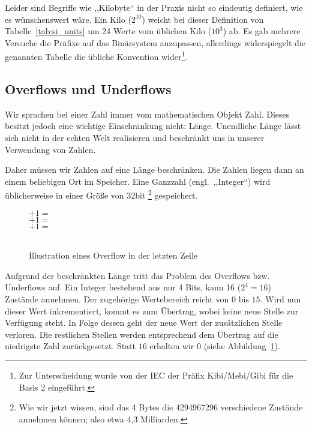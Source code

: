 Leider sind Begriffe wie ,,Kilobyte`` in der Praxis nicht so eindeutig definiert, wie es wünschenswert wäre. Ein Kilo ($2^{10}$) weicht bei dieser Definition von Tabelle~\ref{tab:si_units} um 24 Werte vom üblichen Kilo ($10^3$) ab. Es gab mehrere Versuche die Präfixe auf das Binärsystem anzupassen, allerdings widerspiegelt die genannten Tabelle die übliche Konvention wider\footnote{Zur Unterscheidung wurde von der IEC der Präfix Kibi/Mebi/Gibi für die Basis 2 eingeführt.}.

\subsection{Overflows und Underflows}
%
Wir sprachen bei einer Zahl immer vom mathematischen Objekt Zahl. Dieses
besitzt jedoch eine wichtige Einschränkung nicht: Länge. Unendliche Länge
lässt sich nicht in der echten Welt realisieren und beschränkt uns in
unserer Verwendung von Zahlen.

Daher müssen wir Zahlen auf eine Länge beschränken. Die Zahlen liegen
dann an einem beliebigen Ort im Speicher. Eine Ganzzahl (engl.~,,Integer``)
wird üblicherweise in einer Größe von 32bit%
\footnote{Wie wir jetzt wissen, sind das 4 Bytes die 4294967296
verschiedene Zustände annehmen können; also etwa 4,3 Milliarden.}
gespeichert.

\begin{figure}[ht]
  \begin{center}
        $+ 1 =$ \\
        $+ 1 =$ \\
        $+ 1 =$ \\
        \hspace{27.5pt}~
  \end{center}
  \caption{Illustration eines Overflow in der letzten Zeile}
  \label{fig:overflow}
\end{figure}
%
Aufgrund der beschränkten Länge tritt das Problem des Overflows bzw.
Underflows auf. Ein Integer bestehend aus nur 4 Bits, kann 16 ($2^4 = 16$)
Zustände annehmen. Der zugehörige Wertebereich reicht von $0$ bis $15$.
Wird nun dieser Wert inkrementiert, kommt es zum Übertrag, wobei keine
neue Stelle zur Verfügung steht. In Folge dessen geht der neue Wert der
zusätzlichen Stelle verloren. Die restlichen Stellen werden entsprechend
dem Übertrag auf die niedrigste Zahl zurückgesetzt. Statt $16$ erhalten wir
$0$ (siehe Abbildung~\ref{fig:overflow}).

